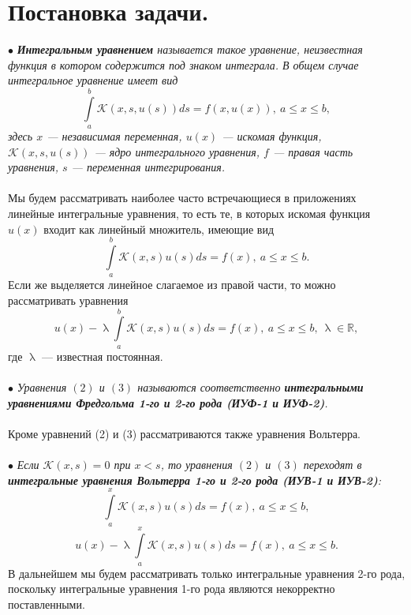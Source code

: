 \documentclass[a4paper, 12pt]{report}
\numberwithin{equation}{section}
\newcommand{\Rm}{\mathbb{R}}
\renewcommand{\leq}{\leqslant}
\renewcommand{\lambda}{\uplambda}
\begin{document}
	\section{Постановка задачи.}
	$\bullet$ \textit{\textbf{Интегральным уравнением} называется такое уравнение, неизвестная функция в котором содержится под знаком интеграла. В общем случае интегральное уравнение имеет вид} 
	\begin{equation}
		\int\limits_a^b \mathcal K(x,s,u(s))ds = f(x,u(x)),\ a \leq x \leq b,
	\end{equation}
	\textit{здесь $x$ --- независимая переменная, $u(x)$ --- искомая функция, $\mathcal K(x,s,u(s))$ --- ядро интегрального уравнения, $f$ --- правая часть уравнения, $s$ --- переменная интегрирования. }\\\\
	Мы будем рассматривать наиболее часто встречающиеся в приложениях линейные интегральные уравнения, то есть те, в которых искомая функция $u(x)$ входит как линейный множитель, имеющие вид 
	\begin{equation}
		\int\limits_a^b \mathcal K( x,s)u(s)ds = f(x),\ a \leq x \leq b.
	\end{equation}
	Если же выделяется линейное слагаемое из правой части, то можно рассматривать уравнения 
	\begin{equation}
		u(x) - \lambda \int\limits_a^b \mathcal K(x,s)u(s)ds = f(x),\ a \leq x \leq b,\ \lambda \in \Rm,
	\end{equation}
	где $\lambda$ --- известная постоянная.\\\\
	$\bullet$ \textit{Уравнения $(2)$ и $(3)$ называются соответственно \textbf{интегральными уравнениями Фредгольма 1-го и 2-го рода (ИУФ-1 и ИУФ-2)}.}\\\\
	Кроме уравнений (2) и (3) рассматриваются также уравнения Вольтерра. \\\\
	$\bullet$ \textit{Если $\mathcal K(x,s) = 0$ при $x<s$, то уравнения $(2)$ и $(3)$ переходят в \textbf{интегральные уравнения Вольтерра 1-го и 2-го рода (ИУВ-1 и ИУВ-2)}:}
	\begin{equation}
		\int\limits_a^x \mathcal K( x,s)u(s)ds = f(x),\ a \leq x \leq b,
	\end{equation}
	\begin{equation}
		u(x) - \lambda \int\limits_a^x \mathcal K(x,s)u(s)ds = f(x),\ a\leq x\leq b.
	\end{equation}
	В дальнейшем мы будем рассматривать только интегральные уравнения 2-го рода, поскольку интегральные уравнения 1-го рода являются некорректно поставленными. \\\\
\end{document}

